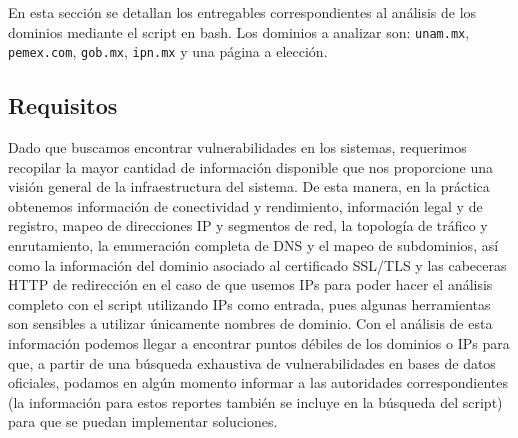 En esta sección se detallan los entregables correspondientes al análisis de los dominios mediante el script en bash. Los dominios a analizar son: \texttt{unam.mx}, \texttt{pemex.com}, \texttt{gob.mx}, \texttt{ipn.mx} y una página a elección.

\subsection*{Requisitos}
Dado que buscamos encontrar vulnerabilidades en los sistemas, requerimos recopilar la mayor cantidad de información disponible que nos proporcione una visión general de la infraestructura del sistema. De esta manera, en la práctica obtenemos información de conectividad y rendimiento, información legal y de registro, mapeo de direcciones IP y segmentos de red, la topología de tráfico y enrutamiento, la enumeración completa de DNS y el mapeo de subdominios, así como la información del dominio asociado al certificado SSL/TLS y las cabeceras HTTP de redirección en el caso de que usemos IPs para poder hacer el análisis completo con el script utilizando IPs como entrada, pues algunas herramientas son sensibles a utilizar únicamente nombres de dominio. Con el análisis de esta información podemos llegar a encontrar puntos débiles de los dominios o IPs para que, a partir de una búsqueda exhaustiva de vulnerabilidades en bases de datos oficiales, podamos en algún momento informar a las autoridades correspondientes (la información para estos reportes también se incluye en la búsqueda del script) para que se puedan implementar soluciones.
